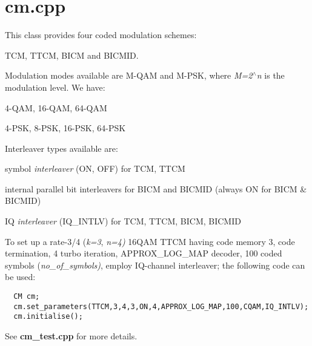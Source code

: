 \section{cm.cpp}
  

 This class provides four coded modulation schemes: \begin{CompactItemize}
\item 
TCM, TTCM, BICM and BICMID.\end{CompactItemize}
Modulation modes available are M-QAM and M-PSK, where {\em M=2$^\wedge$n} is the modulation level. We have:\begin{CompactItemize}
\item 
4-QAM, 16-QAM, 64-QAM\item 
4-PSK, 8-PSK, 16-PSK, 64-PSK\end{CompactItemize}
Interleaver types available are:\begin{CompactItemize}
\item 
symbol {\em interleaver} (ON, OFF) for TCM, TTCM\item 
internal parallel bit interleavers for BICM and BICMID (always ON for BICM \& BICMID)\item 
IQ {\em interleaver} (IQ\_\-INTLV) for TCM, TTCM, BICM, BICMID\end{CompactItemize}
To set up a rate-3/4 ({\em k=3}, {\em n=4)} 16QAM TTCM having code memory 3, code termination, 4 turbo iteration, APPROX\_\-LOG\_\-MAP decoder, 100 coded symbols ({\em no\_\-of\_\-symbols)}, employ IQ-channel interleaver; the following code can be used: \footnotesize\begin{verbatim}  CM cm;
  cm.set_parameters(TTCM,3,4,3,ON,4,APPROX_LOG_MAP,100,CQAM,IQ_INTLV);
  cm.initialise();  \end{verbatim}\normalsize 
 See {\bf cm\_\-test.cpp} for more details.

